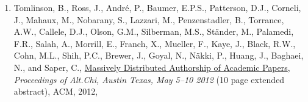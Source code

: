 \begin{enumerate}
\item
  Tomlinson, B., Ross, J., André, P., Baumer, E.P.S., Patterson, D.J.,
  Corneli, J., Mahaux, M., Nobarany, S., Lazzari, M., Penzenstadler, B.,
  Torrance, A.W., Callele, D.J., Olson, G.M., Silberman, M.S., Ständer,
  M., Palamedi, F.R., Salah, A., Morrill, E., Franch, X., Mueller, F.,
  Kaye, J., Black, R.W., Cohn, M.L., Shih, P.C., Brewer, J., Goyal, N.,
  Näkki, P., Huang, J., Baghaei, N., and Saper, C.,
  \href{http://altchi.org/submissions/submission\_wmt\_0.pdf}{Massively
  Distributed Authorship of Academic Papers}, \emph{Proceedings of
  Alt.Chi, Austin Texas, May 5--10 2012} (10 page extended abstract),
  ACM, 2012,
\end{enumerate}
